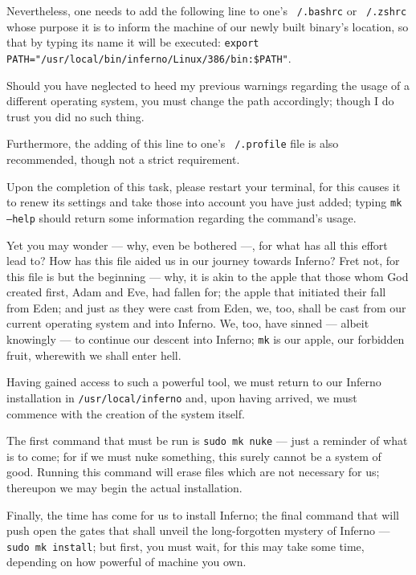 \documentclass[a4paper,12pt]{report}
\begin{document}
  Nevertheless, one needs to add the following line to one's \texttt{~/.bashrc} or \texttt{~/.zshrc} whose purpose it is to inform the machine of our newly built binary's location, so that by typing its name it will be executed: \texttt{export PATH="/usr/local/bin/inferno/Linux/386/bin:\$PATH"}.

  Should you have neglected to heed my previous warnings regarding the usage of a different operating system, you must change the path accordingly; though I do trust you did no such thing.

  Furthermore, the adding of this line to one's \texttt{~/.profile} file is also recommended, though not a strict requirement.

  Upon the completion of this task, please restart your terminal, for this causes it to renew its settings and take those into account you have just added; typing \texttt{mk --help} should return some information regarding the command's usage.

  Yet you may wonder — why, even be bothered —, for what has all this effort lead to? How has this file aided us in our journey towards Inferno? Fret not, for this file is but the beginning — why, it is akin to the apple that those whom God created first, Adam and Eve, had fallen for; the apple that initiated their fall from Eden; and just as they were cast from Eden, we, too, shall be cast from our current operating system and into Inferno. We, too, have sinned — albeit knowingly — to continue our descent into Inferno; \texttt{mk} is our apple, our forbidden fruit, wherewith we shall enter hell.

  Having gained access to such a powerful tool, we must return to our Inferno installation in \texttt{/usr/local/inferno} and, upon having arrived, we must commence with the creation of the system itself.

  The first command that must be run is \texttt{sudo mk nuke} — just a reminder of what is to come; for if we must nuke something, this surely cannot be a system of good. Running this command will erase files which are not necessary for us; thereupon we may begin the actual installation.

  Finally, the time has come for us to install Inferno; the final command that will push open the gates that shall unveil the long-forgotten mystery of Inferno — \texttt{sudo mk install}; but first, you must wait, for this may take some time, depending on how powerful of machine you own.
  \newpage

  \thispagestyle{empty}
    \mbox{}
    \newpage
\end{document}
